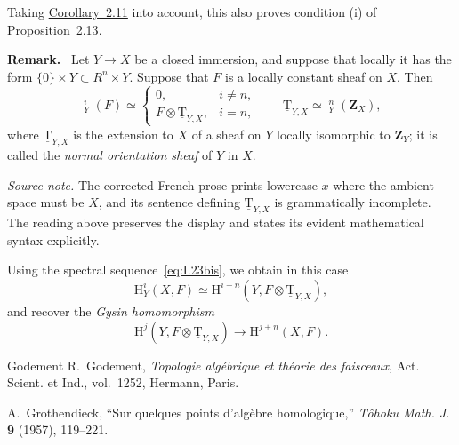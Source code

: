 \documentclass[11pt,a4paper,oneside]{book}
\providecommand{\ZZ}{\mathbf Z}
\providecommand{\uH}{\mathop{\underline{\mathrm H}}\nolimits}
\providecommand{\uT}{\underline{\mathrm T}}
\newenvironment{sgaremark}[1]
  {\par\addvspace{0.8\baselineskip}\noindent\textbf{#1.}\ }
  {\par\addvspace{0.35\baselineskip}}
\theoremstyle{plain}
\theoremstyle{definition}
\theoremstyle{remark}
\begin{document}
Taking \hyperref[I.2.11]{Corollary~2.11} into account, this also proves condition \textup{(i)}
of \hyperref[I.2.13]{Proposition~2.13}.

\begin{sgaremark}{Remark}
Let $Y\to X$ be a closed immersion, and suppose that locally it has the form
$\{0\}\times Y\subset R^n\times Y$. Suppose that $F$ is a locally constant
sheaf on $X$. Then
\begin{equation}
  \uH_Y^i(F)\simeq
  \begin{cases}
    0,& i\ne n,\\
    F\otimes\uT_{Y,X},& i=n,
  \end{cases}
  \qquad
  \uT_{Y,X}\simeq\uH_Y^n(\ZZ_X),
  \tag{30}\label{eq:I.30}
\end{equation}
where $\uT_{Y,X}$ is the extension to $X$ of a sheaf on $Y$ locally
isomorphic to $\ZZ_Y$; it is called the \emph{normal orientation sheaf} of
$Y$ in $X$.
\end{sgaremark}

\noindent\textit{Source note.} The corrected French prose prints lowercase
$x$ where the ambient space must be $X$, and its sentence defining
$\uT_{Y,X}$ is grammatically incomplete. The reading above preserves the
display and states its evident mathematical syntax explicitly.

Using the spectral sequence~\eqref{eq:I.23bis}, we obtain in this case
\begin{equation}
  \mathrm H_Y^i(X,F)
  \simeq
  \mathrm H^{i-n}(Y,F\otimes\uT_{Y,X}),
  \tag{31}\label{eq:I.31}
\end{equation}
and recover the \emph{Gysin homomorphism}
\begin{equation}
  \mathrm H^j(Y,F\otimes\uT_{Y,X})
  \longrightarrow
  \mathrm H^{j+n}(X,F).
  \tag{32}\label{eq:I.32}
\end{equation}

\begin{thebibliography}{Godement}
R.~Godement, \emph{Topologie alg\'ebrique et th\'eorie des faisceaux},
Act. Scient. et Ind., vol.~1252, Hermann, Paris.

A.~Grothendieck, ``Sur quelques points d'alg\`ebre homologique,''
\emph{T\^ohoku Math. J.} \textbf{9} (1957), 119--221.
\end{thebibliography}


\end{document}
